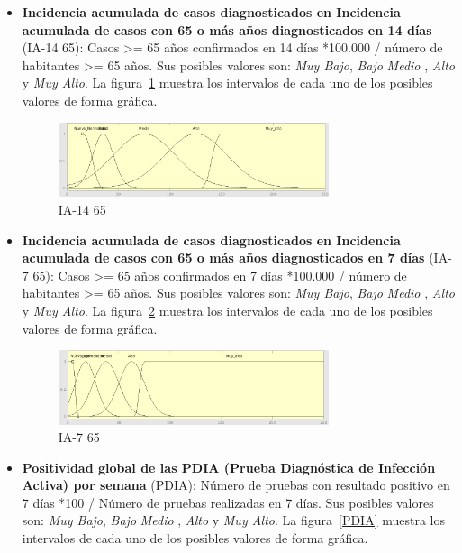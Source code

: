 \documentclass[12pt,a4paper, xcolor=table]{article}
\begin{document}
\begin{itemize}
    \item \textbf{Incidencia acumulada de casos diagnosticados en Incidencia acumulada de casos con 65 o más años diagnosticados en 14 días} (IA-14 65): Casos >= 65 años confirmados en 14 días *100.000 / número de habitantes >= 65 años. Sus posibles valores son: \textit{Muy Bajo}, \textit{Bajo} \textit{Medio }, {\textit{Alto}} y {\textit{Muy Alto}}. La figura~\ref{IA-14 65} muestra los intervalos de cada uno de los posibles valores de forma gráfica.
    
    \begin{figure}[!h]
      \centering
      \includegraphics[width=300px]{img/ia_65_14.png}
      \caption{IA-14 65}
      \label{IA-14 65}
    \end{figure}

    \item \textbf{Incidencia acumulada de casos diagnosticados en Incidencia acumulada de casos con 65 o más años diagnosticados en 7 días} (IA-7 65): Casos >= 65 años confirmados en 7 días *100.000 / número de habitantes >= 65 años. Sus posibles valores son: \textit{Muy Bajo}, \textit{Bajo} \textit{Medio }, {\textit{Alto}} y {\textit{Muy Alto}}. La figura~\ref{IA-7 65} muestra los intervalos de cada uno de los posibles valores de forma gráfica.
    
    \begin{figure}[!h]
      \centering
      \includegraphics[width=300px]{img/ia_65_7.png}
      \caption{IA-7 65}
      \label{IA-7 65}
    \end{figure}

    \item \textbf{Positividad global de las PDIA (Prueba Diagnóstica de Infección Activa) por semana} (PDIA): Número de pruebas con resultado positivo en 7 días *100 / Número de pruebas realizadas en 7 días. Sus posibles valores son: \textit{Muy Bajo}, \textit{Bajo} \textit{Medio }, {\textit{Alto}} y {\textit{Muy Alto}}. La figura~\ref{PDIA} muestra los intervalos de cada uno de los posibles valores de forma gráfica.
    

\end{itemize}
\end{document}
